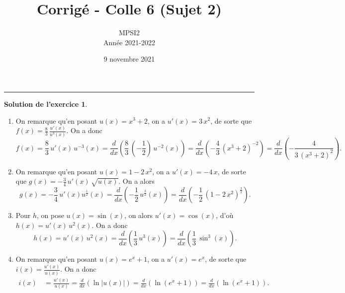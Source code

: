 \documentclass[a4paper, 11pt,openany]{article}%
\title{Corrigé - Colle 6 (Sujet 2)}
\author{MPSI2\\
Année 2021-2022}
\date{9 novembre 2021}
\theoremstyle{plain}
\theoremstyle{definition}
\newtheorem{cours}{Question de cours}
\newtheorem{exo}{Exercice}
\newtheorem{sol}{Solution de l'exercice}
\theoremstyle{remark}
\begin{document}
   \maketitle
      \rule{\linewidth}{0.5mm}


%

\begin{sol}
\begin{enumerate}
\item On remarque qu'en posant $u(x)=x^3+2$, on
a $u'(x)= 3\,x^2$, de sorte que $f(x)=\frac{8}{3}\,\frac{u'(x)}{u^{3}(x)}$. On a donc 
\[
 f(x)=
\frac{8}{3}\,
u'(x)\,u^{-3}(x)=\frac{d}{dx} \left(\frac{8}{3}\,\left(-\frac{1}{2}\right)\,u^{-2}(x)\right)
=\frac{d}{dx} \left(-\frac{4}{3}\,(x^3+2)^{-2}\right)=\frac{d}{dx} \left(
-\frac{4}{3\,(x^3+2)^2}\right).
\] 
\item On remarque qu'en
posant $u(x)=1-2\,x^2$, on a $u'(x)=- 4\,x$, de sorte que $g(x)=-\frac{3}{4}\,u'(x)\,\sqrt{u(x)}$. On a alors
\[
g(x)=-\frac{3}{4}\,  u'(x)
u^{\frac{1}{2}}(x)=\frac{d}{dx} \left(-\frac{1}{2}\,u^{\frac{3}{2}}(x)\right)=
\frac{d}{dx} \left(-\frac{1}{2}\,(1-2\,x^2)^{\frac{3}{2}}\right).
\] 
\item Pour $h$, on pose $u(x)=\sin(x)$, on alors $u'(x)=\cos(x)$, d'où $h(x)=u'(x)\,u^2(x)$. On a donc
\[
h(x)= u'(x)\,u^2(x)= \frac{d}{dx}\left(\frac{1}{3}\, u^3(x)\right)= \frac{d}{dx}\left(\frac{1}{3}\,\sin^3(x)\right).
\]
\item On remarque qu'en posant $u(x)=e^{x}+1$, on a $u'(x)=e^{x}$, de sorte que $i(x)=\frac{u'(x)}{u(x)}$. On a donc
\begin{align*}
 i(x)\, &=\frac{u'(x)}{u(x)}= \frac{d}{dx}\left( \ln |u(x)|\right)=\frac{d}{dx}\left(\ln(e^{x}+1)\right)=\frac{d}{dx}\left(\ln (e^{x}+1)\right).
\end{align*}
\end{enumerate}
\end{sol}
\end{document}
